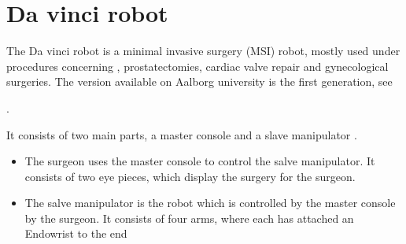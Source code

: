 \section{Da vinci robot}\label{sec:da_vin_rob}

The Da vinci robot is a minimal invasive surgery (MSI) robot, mostly used under procedures concerning , prostatectomies, cardiac valve repair and gynecological surgeries. The version available on Aalborg university is the first generation, see 

. 

It consists of two main parts, a master console and a slave manipulator . 

\begin{itemize}
\item The surgeon uses the master console to control the salve manipulator. It consists of two eye pieces, which display the surgery for the surgeon. 
\item The salve manipulator is the robot which is controlled by the master console by the surgeon. It consists of four arms, where each has attached an Endowrist to the end 
\end{itemize}

